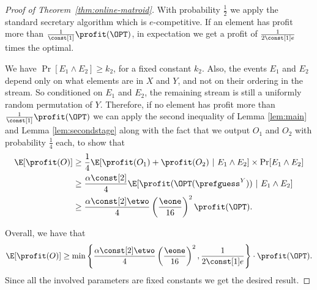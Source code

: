 \begin{proof}[Proof of Theorem~\ref{thm:online-matroid}]
With probability $\frac{1}{2}$ we apply the standard secretary algorithm which is 
$e$-competitive. If an element has profit more than
$\frac{1}{\const[1]} \profit(\OPT)$, in expectation we get a profit of
$\frac{1}{2 \const[1] e}$ times the optimal.

We have $\Pr[E_1 \wedge E_2]\geq k_2 $, for a fixed constant $k_2$. Also, the events $E_1$ and $E_2$ 
depend only on what elements are in $X$ and $Y$, 
and not on their ordering in the stream. So conditioned on $E_1$
and $E_2$, the remaining stream is still a uniformly random
permutation of $Y$. Therefore, if no element has profit more than
$\frac{1}{\const[1]} \profit(\OPT)$ we can apply the second inequality
of Lemma \ref{lem:main} and Lemma \ref{lem:secondstage} along with the
fact that we output $O_1$ and $O_2$ with probability $\frac{1}{4}$
each,  to show that
\begin{align*}
\E[\profit(O)] &\geq \frac{1}{4} \E[\profit(O_1) +
  \profit(O_2)\ |\ E_1 \wedge E_2]\times \Pr[E_1 \wedge E_2]  \\ &\geq \frac{\alpha \const[2]
}{4}\E[\profit(\OPT(\prefguess^Y))\ |\ E_1 \wedge E_2]\\ &\geq
\frac{\alpha \const[2] \etwo}{4}\left(\frac{\eone}{16}\right)^2
\profit(\OPT).
\end{align*}

Overall, we have that \[\E[\profit(O)] \geq \min\left\{\frac{ \alpha
  \const[2]\etwo}{4}\left(\frac{\eone}{16}\right)^2, \frac{1}{2
  \const[1] e}\right\} \cdot \profit(\OPT). \] Since all the involved
parameters are fixed constants we get the desired result.
\end{proof}
















































